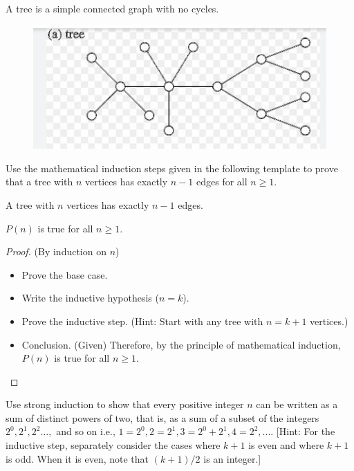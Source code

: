 \documentclass[12pt]{article}
\newcommand{\vs}{\vspace{2mm}}
\newcommand{\ls}{\vspace{5mm}}
\begin{document}
\vs\
\pagebreak


A tree is a simple connected graph with no cycles.

\begin{figure}[!h]
\centering
\includegraphics[scale=1]{TreeExample.jpg}
\caption{}
\label{fig1}
\end{figure}

	Use the mathematical induction steps given  in the following template to prove that a tree with $n$ vertices has exactly $n-1$ edges for all $n \geq 1$.
\vs\


   A tree with $n$ vertices has exactly $n-1$ edges.
\ls\

 $P(n)$ is true for all $n \geq 1$.
\vs\

\begin{proof} (By induction on $n$)

    \begin{itemize}
    \item Prove the base case.
    \item Write the inductive hypothesis ($n=k$).
    \item Prove the inductive step. (Hint: Start with any tree with $n= k+1$ vertices.)
    \item Conclusion. (Given)
    Therefore, by the principle of mathematical induction, $P(n)$ is true for all $n \geq 1.$
    \end{itemize}
    
\end{proof}


Use strong induction to show that every positive integer $n$ can be written as a sum of distinct powers of two, that is, as a sum of a subset of the integers $2^0 , 2^1 , 2^2 …,$ and so on  i.e., $1=2^0 , 2=  2^1 , 3=2^0+ 2^1, 4=2^2 , ... $. [Hint: For the inductive step, separately consider the cases where $k + 1$ is even and where $k+1$ is odd. When it is even, note that $(k + 1)/2$ is an integer.]
\vs\
\end{document}

